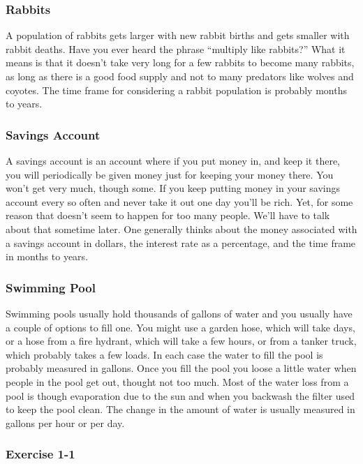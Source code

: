 \documentclass[]{memoir}
\begin{document}
\subsubsection{Rabbits}

A population of rabbits gets larger with new rabbit births and gets
smaller with rabbit deaths. Have you ever heard the phrase ``multiply
like rabbits?'' What it means is that it doesn't take very long for a
few rabbits to become many rabbits, as long as there is a good food
supply and not to many predators like wolves and coyotes. The time frame
for considering a rabbit population is probably months to years.

\subsubsection{Savings Account}

A savings account is an account where if you put money in, and keep it
there, you will periodically be given money just for keeping your money
there. You won't get very much, though some. If you keep putting money
in your savings account every so often and never take it out one day
you'll be rich. Yet, for some reason that doesn't seem to happen for too
many people. We'll have to talk about that sometime later. One generally
thinks about the money associated with a savings account in dollars, the
interest rate as a percentage, and the time frame in months to years.

\subsubsection{Swimming Pool}

Swimming pools usually hold thousands of gallons of water and you
usually have a couple of options to fill one. You might use a garden
hose, which will take days, or a hose from a fire hydrant, which will
take a few hours, or from a tanker truck, which probably takes a few
loads. In each case the water to fill the pool is probably measured in
gallons. Once you fill the pool you loose a little water when people in
the pool get out, thought not too much. Most of the water loss from a
pool is though evaporation due to the sun and when you backwash the
filter used to keep the pool clean. The change in the amount of water is
usually measured in gallons per hour or per day.

\subsubsection{Exercise 1-1}
\end{document}
